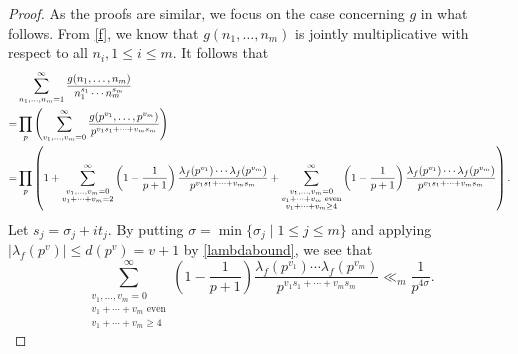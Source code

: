 \documentclass[twoside,leqno,10pt, A4]{amsart}
\begin{document}
\begin{proof}
  As the proofs are similar, we focus on the case concerning $g$ in what follows. From \eqref{f}, we know that $g(n_1, \ldots, n_{m})$ is jointly multiplicative with respect to all $n_i, 1\leq i \leq m$. It follows that
\begin{align*}
&\sum_{n_1,\dots,n_m=1}^{\infty}\frac{g(n_1,\dots,n_m)}{n_1^{s_1}\cdots n_m^{s_m}} \\
=& \prod_{p}\left(\sum_{v_1,\dots,v_m=0}^{\infty}\frac{g(p^{v_1},\dots,p^{v_m})}{p^{v_1s_1+\cdots+v_ms_m}}\right) \\
=& \prod_p \left( 1 + \sum^{\infty}_{\begin{subarray}{c} v_1, \ldots, v_{m}=0 \\ v_1 + \cdots + v_{m} = 2 \end{subarray}} \left( 1 - \frac{1}{p+1} \right) \frac{\lambda_f(p^{v_1})\cdots \lambda_f(p^{v_m})}{p^{v_1 s_1 + \cdots + v_{m} s_{m}}}
+ \sum^{\infty}_{\substack{v_1, \dots, v_m = 0 \\ v_1 + \cdots + v_{m} \text{ even}\\v_1+\cdots+v_m\geq 4}} \left( 1 - \frac{1}{p+1} \right) \frac{\lambda_f(p^{v_1})\cdots \lambda_f(p^{v_m})}{p^{v_1 s_1 + \cdots + v_{m} s_{m}}}\right).
\end{align*}
Let $s_j=\sigma_j+it_j$. By putting \(\sigma = \min\{ \sigma_j \mid 1 \leq j \leq m \}\) and applying $|\lambda_f(p^v)|\leq d(p^v)=v+1$ by \eqref{lambdabound}, we see that
\[
\sum^{\infty}_{\substack{v_1, \dots, v_m = 0 \\ v_1 + \cdots + v_{m} \text{ even}\\v_1+\cdots+v_m\geq 4}} \left( 1 - \frac{1}{p+1} \right) \frac{\lambda_f(p^{v_1})\cdots \lambda_f(p^{v_m})}{p^{v_1 s_1 + \cdots + v_{m} s_{m}}} \ll_m \frac{1}{p^{4\sigma}}.
\]


\end{proof}
\end{document}
